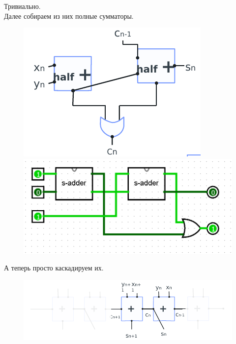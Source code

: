 Тривиально.\\
Далее собираем из них полные сумматоры.
\begin{figure}[H]
    \centering
    \begin{minipage}{0.35\linewidth} %
        \centering
        \includegraphics[width=\linewidth]{Progress/adder.png}
    \end{minipage}%
    \hspace{0.05\linewidth} %
    \begin{minipage}{0.50\linewidth} %
        \centering
        \includegraphics[width=\linewidth]{Progress/adder1.png}
    \end{minipage}
\end{figure}
А теперь просто каскадируем их.
\begin{figure}[H]
    \centering
    \includegraphics[width=1\linewidth]{Progress/3bit-adder.png}
\end{figure}
